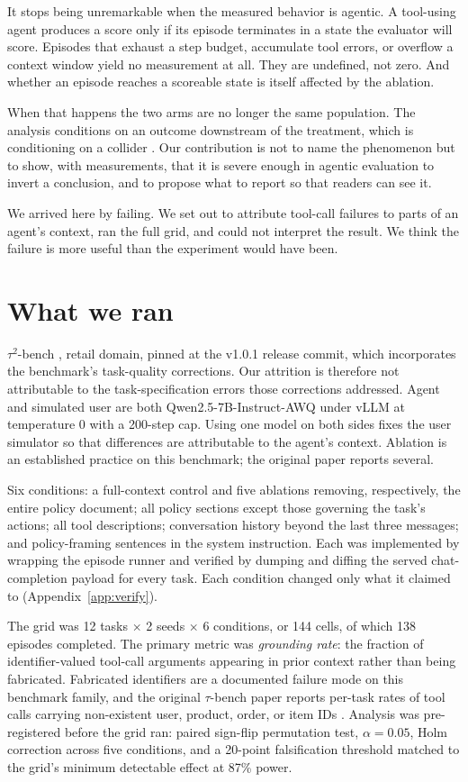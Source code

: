 \documentclass{article}
\begin{document}
It stops being unremarkable when the measured behavior is agentic. A tool-using agent
produces a score only if its episode terminates in a state the evaluator will score.
Episodes that exhaust a step budget, accumulate tool errors, or overflow a context
window yield no measurement at all. They are undefined, not zero. And whether an
episode reaches a scoreable state is itself affected by the ablation.

When that happens the two arms are no longer the same population. The analysis
conditions on an outcome downstream of the treatment, which is conditioning on a
collider \citep{elwert2014endogenous}. Our contribution is not to name the phenomenon
but to show, with measurements, that it is severe enough in agentic evaluation to
invert a conclusion, and to propose what to report so that readers can see it.

We arrived here by failing. We set out to attribute tool-call failures to parts of an
agent's context, ran the full grid, and could not interpret the result. We think the
failure is more useful than the experiment would have been.

\section{What we ran}

$\tau^2$-bench \citep{barres2025tau2}, retail domain, pinned at the v1.0.1 release
commit, which incorporates the benchmark's task-quality corrections. Our attrition is
therefore not attributable to the task-specification errors those corrections
addressed. Agent and simulated user are both Qwen2.5-7B-Instruct-AWQ under vLLM at temperature 0 with a
200-step cap. Using one model on both sides fixes the user simulator so that
differences are attributable to the agent's context. Ablation is an established
practice on this benchmark; the original paper reports several.

Six conditions: a full-context control and five ablations removing, respectively, the
entire policy document; all policy sections except those governing the task's actions;
all tool descriptions; conversation history beyond the last three messages; and
policy-framing sentences in the system instruction. Each was implemented by wrapping
the episode runner and verified by dumping and diffing the served chat-completion
payload for every task. Each condition changed only what it claimed to
(Appendix~\ref{app:verify}).

The grid was 12 tasks $\times$ 2 seeds $\times$ 6 conditions, or 144 cells, of which
138 episodes completed. The primary metric was \emph{grounding rate}: the fraction of
identifier-valued tool-call arguments appearing in prior context rather than being
fabricated. Fabricated identifiers are a documented failure mode on this benchmark
family, and the original $\tau$-bench paper reports per-task rates of tool calls
carrying non-existent user, product, order, or item IDs \citep{yao2024taubench}.
Analysis was pre-registered before the grid ran: paired sign-flip permutation test,
$\alpha = 0.05$, Holm correction across five conditions, and a 20-point falsification
threshold matched to the grid's minimum detectable effect at 87\% power.
\end{document}

